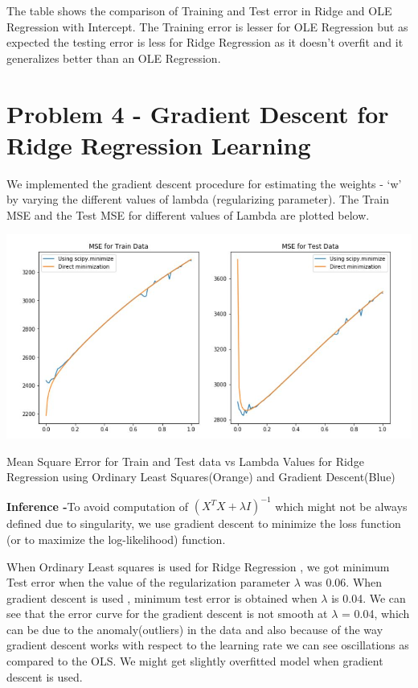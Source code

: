 \documentclass[12pt]{extarticle}
\begin{document}
\vspace{3mm}
The table shows the comparison of Training and Test error in Ridge and OLE Regression with Intercept. The Training error is lesser for OLE Regression but as expected the testing error is less for Ridge Regression as it doesn't overfit and it generalizes better than an OLE Regression.

\newpage
\section{Problem 4 - Gradient Descent for Ridge Regression Learning}

We implemented the gradient descent procedure for estimating the weights - ‘w’ by varying the different values of lambda (regularizing parameter). The Train MSE and the Test MSE for different values of Lambda are plotted below.

\begin{center}
  \centering
  \includegraphics[width=\textwidth]{Q4.JPG}
  \caption{Mean Square Error for Train and Test data vs Lambda Values for Ridge Regression using Ordinary Least Squares(Orange) and Gradient Descent(Blue)}
\end{center}

\textbf{Inference -}To avoid computation of $(X^TX + \lambda I)^{-1}$ which might not be always defined due to singularity, we use gradient descent to minimize the loss function (or to maximize the log-likelihood) function. 


When Ordinary Least squares is used for Ridge Regression , we got minimum Test error when the value of the regularization parameter $\lambda$ was 0.06.
When gradient descent is used , minimum test error is obtained when $\lambda$ is 0.04. We can see that the error curve for the gradient descent is not smooth at $\lambda$ = 0.04, which can be due to the anomaly(outliers) in the data and also because of the way gradient descent works with respect to the learning rate we can see oscillations as compared to the OLS. We might get slightly overfitted model when gradient descent is used.
\end{document}
